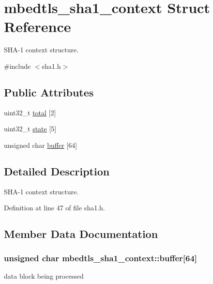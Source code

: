 \hypertarget{structmbedtls__sha1__context}{\section{mbedtls\-\_\-sha1\-\_\-context Struct Reference}
\label{structmbedtls__sha1__context}
}


S\-H\-A-\/1 context structure.  




{\ttfamily \#include $<$sha1.\-h$>$}

\subsection*{Public Attributes}
\begin{DoxyCompactItemize}
\item 
uint32\-\_\-t \hyperlink{structmbedtls__sha1__context_a19789ddfacc37f47eb34e26ae718997e}{total} \mbox{[}2\mbox{]}
\item 
uint32\-\_\-t \hyperlink{structmbedtls__sha1__context_af651fef2b175fced6b05aa196fe1f0c8}{state} \mbox{[}5\mbox{]}
\item 
unsigned char \hyperlink{structmbedtls__sha1__context_ae3dcb1efeeb082beb006590a84ef22ec}{buffer} \mbox{[}64\mbox{]}
\end{DoxyCompactItemize}


\subsection{Detailed Description}
S\-H\-A-\/1 context structure. 

Definition at line 47 of file sha1.\-h.



\subsection{Member Data Documentation}
\hypertarget{structmbedtls__sha1__context_ae3dcb1efeeb082beb006590a84ef22ec}{
\subsubsection[{buffer}]{\setlength{\rightskip}{0pt plus 5cm}unsigned char mbedtls\-\_\-sha1\-\_\-context\-::buffer\mbox{[}64\mbox{]}}}\label{structmbedtls__sha1__context_ae3dcb1efeeb082beb006590a84ef22ec}
data block being processed 

